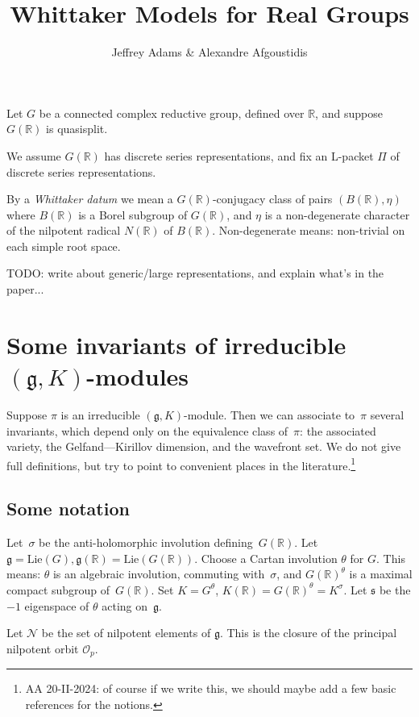 \documentclass[10pt,leqno]{article}
\renewcommand{\O}{\mathcal O}
\newcommand{\R}{\mathbb R}
\newcommand{\N}{\mathcal N}
\newcommand{\Lie}{\mathrm{Lie}}
\newcommand{\g}{\mathfrak g}
\newcommand{\s}{\mathfrak s}
\newcommand{\Op}{\O_p}
\begin{document}
\title{Whittaker Models for Real Groups}
\author{Jeffrey Adams \& Alexandre Afgoustidis}
\maketitle

Let $G$ be a connected complex reductive group, defined over $\R$, and suppose $G(\R)$ is quasisplit.


We assume $G(\R)$ has discrete series representations, and fix an L-packet $\Pi$ of discrete series representations.

By a  {\it Whittaker datum} we mean a $G(\R)$-conjugacy class of pairs  $(B(\R),\eta)$ where $B(\R)$ is a
Borel subgroup of $G(\R)$, 
and $\eta$ is a non-degenerate character of the nilpotent radical $N(\R)$ of $B(\R)$. Non-degenerate means: non-trivial on each simple root space.

TODO: write about generic/large representations, and explain what's in the paper...

\section{Some invariants of irreducible $(\g, K)$-modules}



Suppose $\pi$ is an irreducible $(\g,K)$-module. Then we can associate to~$\pi$ several invariants, which depend only on the equivalence class of~$\pi$: the associated variety, the Gelfand---Kirillov dimension, and the wavefront set.  We do not give full definitions, but try to point to convenient places in the literature.\footnote{AA 20-II-2024: of course if we write this, we should maybe add a few basic references for the notions.}

\subsection{Some notation}

Let~$\sigma$ be the anti-holomorphic involution defining~$G(\R)$. 
Let $\g=\Lie(G), \g(\R)=\Lie(G(\R))$. Choose a Cartan involution $\theta$ for $G$. This means:
$\theta$ is an algebraic involution, commuting with~$\sigma$,
and $G(\R)^\theta$ is a maximal compact subgroup of~$G(\R)$. Set $K=G^\theta$, $K(\R)=G(\R)^\theta=K^\sigma$.
Let $\s$ be the $-1$ eigenspace of $\theta$ acting on~$\g$.

Let $\N$ be the set of nilpotent elements of $\g$.
This is the closure of the principal nilpotent orbit $\Op$.
\end{document}
